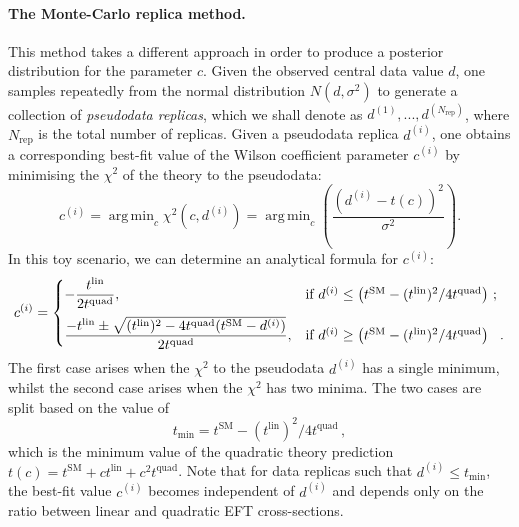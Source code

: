 \documentclass[withindex,glossary]{cam-thesis}
\DeclareMathOperator*{\argmin}{arg\,min}
\begin{document}
\paragraph{The Monte-Carlo replica method.}
%
This method takes a different approach in order to produce a posterior distribution for the parameter $c$.
%
Given the observed central data value $d$, one samples repeatedly from the normal distribution $N(d, \sigma^2)$ to generate a collection of \textit{pseudodata replicas}, which we shall denote as $d^{(1)}, ..., d^{(N_{\text{rep}})}$, where $N_{\text{rep}}$ is the total number of replicas.
%
Given a pseudodata replica $d^{(i)}$, one obtains a corresponding best-fit value of the Wilson coefficient parameter $c^{(i)}$ by minimising the $\chi^2$ of the theory to the pseudodata:
\begin{equation}
c^{(i)} = \argmin_{c} \chi^2(c,d^{(i)}) = \argmin_{c} \left( \frac{(d^{(i)} - t(c))^2}{\sigma^2} \right).
\end{equation}
In this toy scenario, we can determine an analytical formula for $c^{(i)}$:
\begin{equation}
  c^{(i)} = \begin{cases} \displaystyle -\frac{t^{\text{lin}}}{2t^{\text{quad}}}, & \text{if $d^{(i)} \leq \left( t^{\text{SM}} - (t^{\text{lin}})^2/4t^{\text{quad}}\right) $ ;} \label{eq:app1} \\[2ex]
    \displaystyle \frac{-t^{\text{lin}} \pm \sqrt{(t^{\text{lin}})^2 - 4t^{\text{quad}}(t^{\text{SM}} - d^{(i)})}}{2t^{\text{quad}}}, & \text{if $d^{(i)} \geq \left( t^{\text{SM}} - (t^{\text{lin}})^2/4t^{\text{quad}}\right) $  \, .} \end{cases}
\end{equation}
The first case arises when the $\chi^2$ to the pseudodata $d^{(i)}$ has a single minimum, whilst the second case arises when the $\chi^2$  has two minima.
%
The two cases are split based on the value of
\begin{equation}
\label{eq:crosssec_minimum}
t_{\text{min}} = t^{\text{SM}} - (t^{\text{lin}})^2/4t^{\text{quad}} \, ,
\end{equation}
which is the minimum value of the quadratic theory prediction $t(c) = t^{\text{SM}} + c t^{\text{lin}} + c^2 t^{\text{quad}}$. Note that for data replicas such that $d^{(i)}\le t_{\text{min}}$, the best-fit value $c^{(i)}$
becomes independent of $d^{(i)}$ and depends only on the ratio between linear and quadratic
EFT cross-sections.
\end{document}
